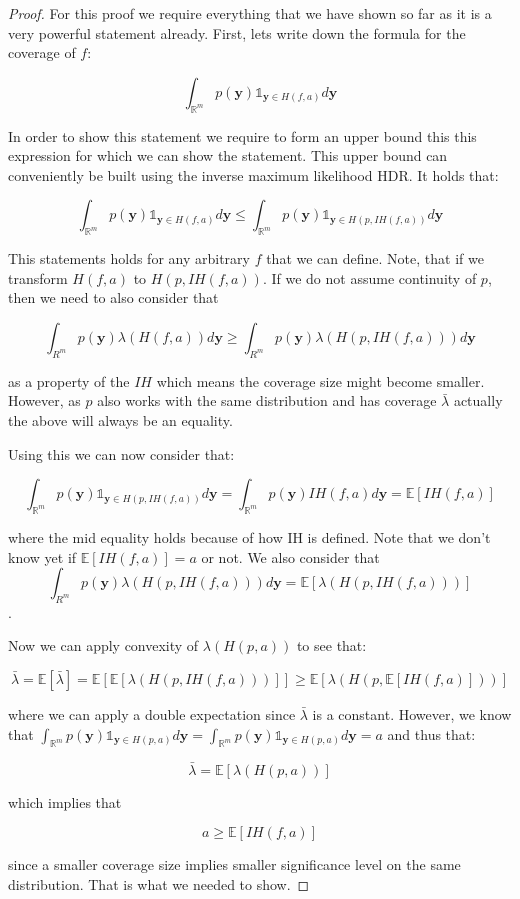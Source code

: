 \documentclass{article}
\theoremstyle{definition}
\begin{document}
\begin{proof}
For this proof we require everything that we have shown so far as it is a very powerful statement already. First, lets write down the formula for the coverage of $f$:

$$\int_{\mathbb{R}^{m}} p(\mathbf{y}) \mathds1_{\mathbf{y} \in H(f, a)} d \mathbf{y} $$

In order to show this statement we require to form an upper bound this this expression for which we can show the statement. This upper bound can conveniently be built using the inverse maximum likelihood HDR. It holds that:

$$\int_{\mathbb{R}^{m}} p(\mathbf{y}) \mathds1_{\mathbf{y} \in H(f, a)} d \mathbf{y} 
\leq \int_{\mathbb{R}^{m}} p(\mathbf{y}) \mathds1_{\mathbf{y} \in H(p, IH(f, a))} d \mathbf{y}$$

This statements holds for any arbitrary $f$ that we can define. Note, that if we transform $H(f,a)$ to $H(p, IH(f, a))$. If we do not assume continuity of $p$, then we need to also consider that

$$\int_{R^m} p(\mathbf{y}) \lambda(H(f, a)) d \mathbf{y} \geq \int_{R^m} p(\mathbf{y}) \lambda(H(p, IH(f,a))) d \mathbf{y}$$

as a property of the $IH$ which means the coverage size might become smaller. However, as $p$ also works with the same distribution and has coverage $\bar{\lambda}$ actually the above will always be an equality.

Using this we can now consider that:

$$\int_{\mathbb{R}^{m}} p(\mathbf{y}) \mathds1_{\mathbf{y} \in H(p, IH(f, a))} d \mathbf{y} = \int_{\mathbb{R}^{m}} p(\mathbf{y}) IH(f, a) d \mathbf{y} = \mathbb{E}\left[IH(f, a)\right]$$

where the mid equality holds because of how IH is defined. Note that we don't know yet if $\mathbb{E}\left[IH(f, a)\right] = a$ or not. We also consider that
$$\int_{R^m} p(\mathbf{y}) \lambda(H(p, IH(f,a))) d \mathbf{y} = \mathbb{E}\left[\lambda(H(p, IH(f,a)))\right]$$.

Now we can apply convexity of $\lambda(H(p,a))$ to see that:

$$\bar{\lambda} = \mathbb{E}\left[\bar{\lambda}\right] = \mathbb{E}\left[\mathbb{E}\left[\lambda(H(p, IH(f,a)))\right]\right] \geq \mathbb{E} \left[\lambda(H(p, \mathbb{E}\left[IH(f, a)\right]))\right]$$

where we can apply a double expectation since $\bar{\lambda}$ is a constant. However, we know that $\int_{\mathbb{R}^{m}} p(\mathbf{y}) \mathds1_{\mathbf{y} \in H(p, a)} d \mathbf{y} = \int_{\mathbb{R}^{m}} p(\mathbf{y}) \mathds1_{\mathbf{y} \in H(p, a)} d \mathbf{y} = a$ and thus that:

$$\bar{\lambda} = \mathbb{E}\left[\lambda(H(p, a))\right]$$

which implies that

$$a \geq \mathbb{E}\left[IH(f, a)\right]$$

since a smaller coverage size implies smaller significance level on the same distribution. That is what we needed to show.

\end{proof}
\end{document}
